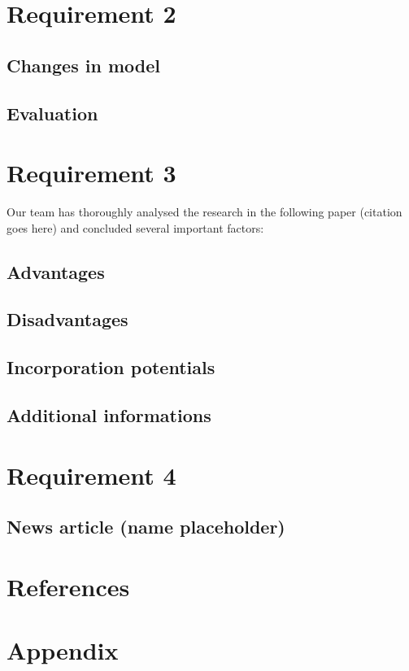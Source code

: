 \documentclass[12pt]{article}
\begin{document}
\section{Requirement 2}
\subsection{Changes in model}

\subsection{Evaluation}


\section{Requirement 3}
Our team has thoroughly analysed the research in the following paper (citation goes here) and concluded several important factors:
\subsection{Advantages}

\subsection{Disadvantages}

\subsection{Incorporation potentials}

\subsection{Additional informations}


\section{Requirement 4}
\subsection{News article (name placeholder)}


\section{References}


\section{Appendix}
\end{document}
